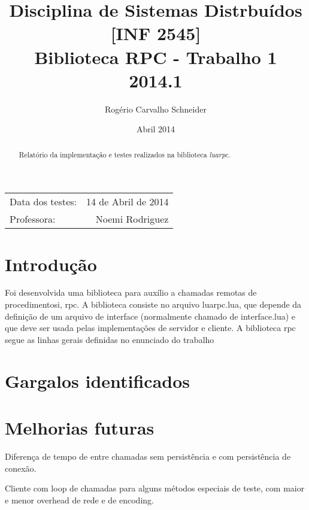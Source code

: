\documentclass[11pt]{article}
\begin{document}
\title{Disciplina de Sistemas Distrbuídos [INF 2545] \\ Biblioteca RPC - Trabalho 1 \\ 2014.1}
\author{Rogério Carvalho Schneider}
\date{Abril 2014}
\maketitle

\begin{center}
\begin{tabular}{l r}
Data dos testes: & 14 de Abril de 2014 \\
Professora: & Noemi Rodriguez
\end{tabular}
\end{center}

\begin{abstract}
Relatório da implementação e testes realizados na biblioteca \textit{luarpc}.
\end{abstract}

 \setcounter{page}{1}
\doublespacing

\section{Introdução}\label{sec:introduction}

Foi desenvolvida uma biblioteca para auxílio a chamadas remotas de
procedimentosi, \gls{rpc}. A biblioteca consiste no arquivo luarpc.lua, que depende da
definição de um arquivo de interface (normalmente chamado de interface.lua) e
que deve ser usada pelas implementações de servidor e cliente.
A biblioteca \gls{rpc} segue as linhas gerais definidas no enunciado do trabalho
\cite{trab1}

\section{Gargalos identificados}\label{sec:bottle}

\section{Melhorias futuras}\label{sec:future}

Diferença de tempo de entre chamadas sem persistência e com persistência de
conexão.

Cliente com loop de chamadas para alguns métodos especiais de teste, com maior
e menor overhead de rede e de encoding.
\end{document}
